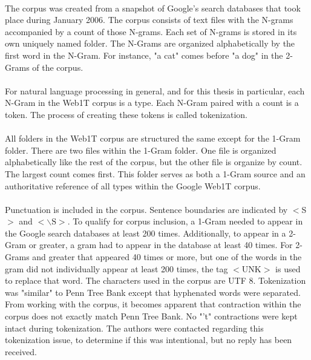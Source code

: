 		\paragraph{} The corpus was created from a snapshot of Google's search databases that took place during January 2006.  The corpus consists of text files with the N-grams accompanied by a count of those N-grams.  Each set of N-grams is stored in its own uniquely named folder.  The N-Grams are organized alphabetically by the first word in the N-Gram.  For instance, "a cat" comes before "a dog" in the 2-Grams of the corpus. 
		\paragraph*{} For natural language processing in general, and for this thesis in particular, each N-Gram in the Web1T corpus is a type.  Each N-Gram paired with a count is a token.  The process of creating these tokens is called tokenization.\cite{brants_web_2006}  
		\paragraph{} All folders in the Web1T corpus are structured the same except for the 1-Gram folder.  There are two files within the 1-Gram folder.  One file is organized alphabetically like the rest of the corpus, but the other file is organize by count.  The largest count comes first. This folder serves as both a 1-Gram source and an authoritative reference of all types within the Google Web1T corpus.\cite{brants_web_2006}
		\paragraph{} Punctuation is included in the corpus.  Sentence boundaries are indicated by $<$S$>$ and $<\backslash\text{S}>$.  To qualify for corpus inclusion, a 1-Gram needed to appear in the Google search databases at least 200 times.  Additionally, to appear in a 2-Gram or greater, a gram had to appear in the database at least 40 times.  For 2-Grams and greater that appeared 40 times or more, but one of the words in the gram did not individually appear at least 200 times, the tag $<$UNK$>$ is used to replace that word.  The characters used in the corpus are UTF 8.  Tokenization was "similar" to Penn Tree Bank except that hyphenated words were separated.\cite{brants_web_2006}  From working with the corpus, it becomes apparent that contraction within the corpus does not exactly match Penn Tree Bank.  No "'t" contractions were kept intact during tokenization.  The authors were contacted regarding this tokenization issue, to determine if this was intentional, but no reply has been received.
